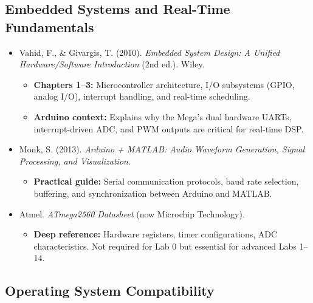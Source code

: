 \documentclass[12pt]{article}
\begin{document}
\subsection*{Embedded Systems and Real-Time Fundamentals}

\begin{itemize}
    \item Vahid, F., \& Givargis, T. (2010). \textit{Embedded System Design: A Unified Hardware/Software Introduction} (2nd ed.). Wiley.
    \begin{itemize}
        \item \textbf{Chapters 1--3:} Microcontroller architecture, I/O subsystems (GPIO, analog I/O), interrupt handling, and real-time scheduling.
        \item \textbf{Arduino context:} Explains why the Mega's dual hardware UARTs, interrupt-driven ADC, and PWM outputs are critical for real-time DSP.
    \end{itemize}

    \item Monk, S. (2013). \textit{Arduino + MATLAB: Audio Waveform Generation, Signal Processing, and Visualization}.
    \begin{itemize}
        \item \textbf{Practical guide:} Serial communication protocols, baud rate selection, buffering, and synchronization between Arduino and MATLAB.
    \end{itemize}

    \item Atmel. \textit{ATmega2560 Datasheet} (now Microchip Technology).
    \begin{itemize}
        \item \textbf{Deep reference:} Hardware registers, timer configurations, ADC characteristics. Not required for Lab 0 but essential for advanced Labs 1--14.
    \end{itemize}
\end{itemize}

\subsection*{Operating System Compatibility}
\end{document}
